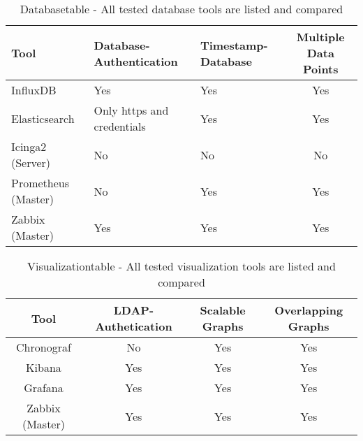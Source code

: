 \begin{table}
\centering

\label{tab:database}
\begin{tabular}{p{3cm}p{3cm}p{3cm}c}
	\hline
Tool & Database-Authentication     & Timestamp-Database          & Multiple Data Points        \\
\hline
InfluxDB                     & Yes & Yes                         & Yes                         \\
Elasticsearch                & Only https and credentials  & Yes & Yes                         \\
Icinga2 (Server)             & No                          & No                          & No                          \\
Prometheus (Master)          & No                          & Yes & Yes                         \\
Zabbix (Master)              & Yes                         & Yes                         & Yes\\
\hline
\end{tabular}
\caption{Databasetable - All tested database tools are listed and compared}
\end{table}

\begin{table} 
\centering

\label{tab:Visualization}
\begin{tabular}{cccc}
	\hline
Tool & LDAP-Authetication         & Scalable Graphs             & Overlapping Graphs          \\
\hline
Chronograf                   & No & Yes                         & Yes                         \\
Kibana                       & Yes                        & Yes & Yes                         \\
Grafana                      & Yes                        & Yes & Yes                         \\
Zabbix (Master)              & Yes                        & Yes                         & Yes\\
\hline
\end{tabular}
\caption{Visualizationtable - All tested visualization tools are listed and compared}
\end{table}

